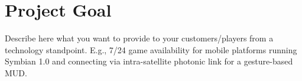\section{Project Goal}

Describe here what you want to provide to your customers/players from a technology standpoint.
E.g., 7/24 game availability for mobile platforms running Symbian 1.0 and connecting via intra-satellite photonic link for a gesture-based MUD.

\pagebreak 